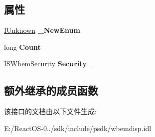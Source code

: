 \subsection*{属性}
\begin{DoxyCompactItemize}
\item 
\mbox{\label{interface_wbem_scripting_1_1_i_s_wbem_object_set_a24b72257c485555ea0c61a4e9f307770}} 
\hyperlink{interface_i_unknown}{I\+Unknown} {\bfseries \+\_\+\+New\+Enum}
\item 
\mbox{\label{interface_wbem_scripting_1_1_i_s_wbem_object_set_a3df528cd42c6e4f9ec24ceb55e9ce2e4}} 
long {\bfseries Count}
\item 
\mbox{\label{interface_wbem_scripting_1_1_i_s_wbem_object_set_a91dd36228a9a7c959f1d18a80684ee59}} 
\hyperlink{interface_wbem_scripting_1_1_i_s_wbem_security}{I\+S\+Wbem\+Security} {\bfseries Security\+\_\+}
\end{DoxyCompactItemize}
\subsection*{额外继承的成员函数}


该接口的文档由以下文件生成\+:\begin{DoxyCompactItemize}
\item 
E\+:/\+React\+O\+S-\/0../sdk/include/psdk/wbemdisp.\+idl\end{DoxyCompactItemize}
